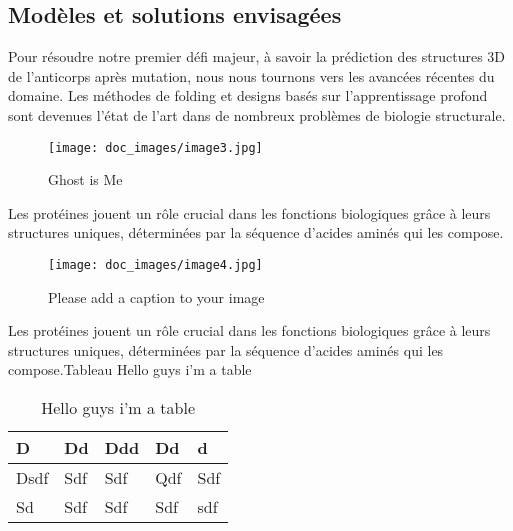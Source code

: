 \subsection{Modèles et solutions envisagées}
Pour résoudre notre premier défi majeur, à savoir la prédiction des structures 3D de l’anticorps après mutation, nous nous tournons vers les avancées récentes du domaine. Les méthodes de folding et designs basés sur l’apprentissage profond sont devenues l’état de l’art dans de nombreux problèmes de biologie structurale.\begin{figure}[H]
\centering
\texttt{[image: doc\_images/image3.jpg]}
\caption{\label{Ghost_is_Me} Ghost is Me}\end{figure}Les protéines jouent un rôle crucial dans les fonctions biologiques grâce à leurs structures uniques, déterminées par la séquence d’acides aminés qui les compose.\begin{figure}[H]
\centering
\texttt{[image: doc\_images/image4.jpg]}
\caption{\label{Please_add_a_caption_to_your_image} Please add a caption to your image}\end{figure}Les protéines jouent un rôle crucial dans les fonctions biologiques grâce à leurs structures uniques, déterminées par la séquence d’acides aminés qui les compose.Tableau Hello guys i'm a table\begin{table}[H]
\centering
\begin{tabular}{|p{3.20cm}|p{3.20cm}|p{3.20cm}|p{3.20cm}|p{3.20cm}|}
\hline
D & Dd & Ddd & Dd & d \\
\hline
Dsdf & Sdf & Sdf & Qdf & Sdf \\
\hline
Sd & Sdf & Sdf & Sdf & sdf \\
\hline
\end{tabular}
\caption{Hello guys i'm a table}
\label{table_1}
\end{table}

